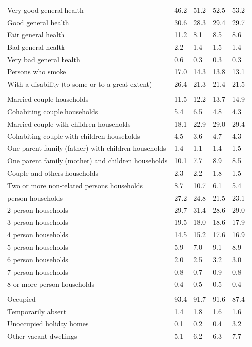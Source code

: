 \documentclass{article}
\begin{document}
\begin{table}[h]
\begin{tabular}{KTTTT}
    \hline
Very good general health & 46.2& 51.2&52.5& 53.2\\
Good general health & 30.6& 28.3& 29.4& 29.7\\
Fair general health & 11.2&  8.1& 8.5&  8.6\\
Bad general health & 2.2& 1.4&1.5& 1.4\\
Very bad general health & 0.6& 0.3&0.3& 0.3\\
    \hline
Persons who smoke & 17.0& 14.3&13.8& 13.1\\
    \hline
With a disability (to some or to a great extent) & 26.4& 21.3&21.4& 21.5\\
\hline
    \\ 
    \hline
Married couple households & 11.5& 12.2& 13.7& 14.9\\
Cohabiting couple households & 5.4& 6.5& 4.8& 4.3\\
Married couple with children households & 18.1& 22.9& 29.0& 29.4\\
Cohabiting couple with children households & 4.5& 3.6& 4.7& 4.3\\
One parent family (father) with  children households & 1.4& 1.1& 1.4& 1.5\\
One parent family (mother) and children households & 10.1&  7.7&  8.9&  8.5\\
Couple and others households  & 2.3& 2.2& 1.8& 1.5\\
Two or more non-related persons households &  8.7& 10.7&  6.1&  5.4\\
     person households & 27.2& 24.8& 21.5& 23.1\\
2 person households & 29.7& 31.4& 28.6& 29.0\\
3 person households & 19.5& 18.0& 18.6& 17.9\\
4 person households & 14.5& 15.2& 17.6& 16.9\\
5 person households & 5.9& 7.0& 9.1& 8.9\\
6 person households & 2.0& 2.5& 3.2& 3.0\\
7 person households & 0.8& 0.7& 0.9& 0.8\\
8 or more person households & 0.4& 0.5& 0.5& 0.4\\
\hline
    \\ 
    \hline
Occupied & 93.4& 91.7& 91.6& 87.4\\
Temporarily absent & 1.4& 1.8& 1.6& 1.6\\
Unoccupied holiday homes & 0.1& 0.2& 0.4& 3.2\\
Other vacant dwellings & 5.1& 6.2& 6.3& 7.7\\
\hline
\end{tabular}
\end{table}
\end{document}
